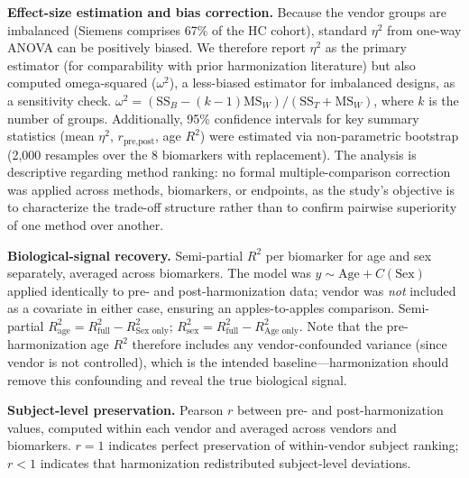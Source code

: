 \documentclass[12pt,a4paper]{article}
\begin{document}
\textbf{Effect-size estimation and bias correction.} Because the vendor groups are imbalanced (Siemens comprises 67\% of the HC cohort), standard $\eta^2$ from one-way ANOVA can be positively biased. We therefore report $\eta^2$ as the primary estimator (for comparability with prior harmonization literature) but also computed omega-squared ($\omega^2$), a less-biased estimator for imbalanced designs, as a sensitivity check. $\omega^2 = (\text{SS}_B - (k-1)\text{MS}_W) / (\text{SS}_T + \text{MS}_W)$, where $k$ is the number of groups. Additionally, 95\% confidence intervals for key summary statistics (mean $\eta^2$, $r_{\text{pre,post}}$, age $R^2$) were estimated via non-parametric bootstrap (2,000 resamples over the 8 biomarkers with replacement). The analysis is descriptive regarding method ranking: no formal multiple-comparison correction was applied across methods, biomarkers, or endpoints, as the study's objective is to characterize the trade-off structure rather than to confirm pairwise superiority of one method over another.

\textbf{Biological-signal recovery.} Semi-partial $R^2$ per biomarker for age and sex separately, averaged across biomarkers. The model was $y \sim \text{Age} + C(\text{Sex})$ applied identically to pre- and post-harmonization data; vendor was \emph{not} included as a covariate in either case, ensuring an apples-to-apples comparison. Semi-partial $R^2_{\text{age}} = R^2_{\text{full}} - R^2_{\text{Sex only}}$; $R^2_{\text{sex}} = R^2_{\text{full}} - R^2_{\text{Age only}}$. Note that the pre-harmonization age $R^2$ therefore includes any vendor-confounded variance (since vendor is not controlled), which is the intended baseline---harmonization should remove this confounding and reveal the true biological signal.

\textbf{Subject-level preservation.} Pearson $r$ between pre- and post-harmonization values, computed within each vendor and averaged across vendors and biomarkers. $r=1$ indicates perfect preservation of within-vendor subject ranking; $r<1$ indicates that harmonization redistributed subject-level deviations.
\end{document}
